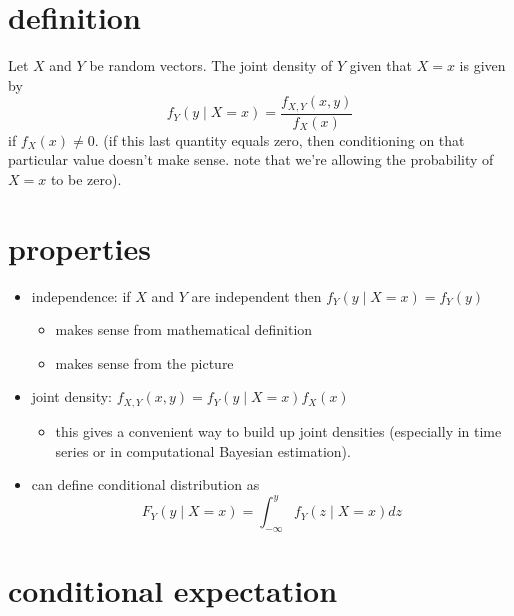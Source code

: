 \section{definition}

    Let $X$ and $Y$ be random vectors.  The joint density of $Y$
    given that $X = x$ is given by
    \[ f_Y(y ∣ X = x) = \frac{f_{X,Y}(x, y)}{f_X(x)} \]
    if $f_X(x) ≠ 0$.  (if this last quantity equals zero, then
    conditioning on that particular value doesn't make sense.  note
    that we're allowing the probability of $X=x$ to be zero).

\section{properties}

\begin{itemize}
\item independence: if $X$ and $Y$ are independent then 
  $f_Y(y ∣ X = x) = f_Y(y)$
\begin{itemize}
\item makes sense from mathematical definition
\item makes sense from the picture
\end{itemize}
\item joint density: $f_{X,Y}(x,y) = f_Y(y ∣ X = x) f_X(x)$
\begin{itemize}
\item this gives a convenient way to build up joint densities
        (especially in time series or in computational Bayesian
        estimation).
\end{itemize}
\item can define conditional distribution as
      \[ F_Y(y ∣ X = x) = ∫_{-∞}^y f_Y(z ∣ X = x) dz \]
\end{itemize}

\section{conditional expectation}

